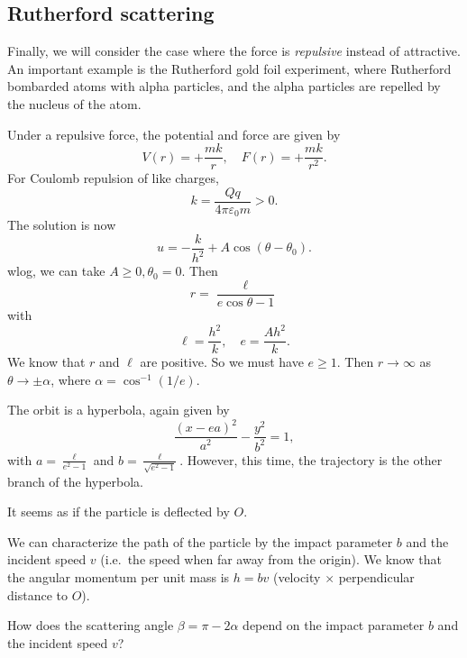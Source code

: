 \documentclass[a4paper]{article}
\begin{document}
\subsection{Rutherford scattering}
Finally, we will consider the case where the force is \emph{repulsive} instead of attractive. An important example is the Rutherford gold foil experiment, where Rutherford bombarded atoms with alpha particles, and the alpha particles are repelled by the nucleus of the atom.

Under a repulsive force, the potential and force are given by
\[
  V(r) = +\frac{mk}{r}, \quad F(r) = +\frac{mk}{r^2}.
\]
For Coulomb repulsion of like charges,
\[
  k = \frac{Qq}{4\pi \varepsilon_0 m} > 0.
\]
The solution is now
\[
  u = -\frac{k}{h^2} + A\cos (\theta - \theta_0).
\]
wlog, we can take $A \geq 0, \theta_0 = 0$. Then
\[
  r = \frac{\ell}{e\cos \theta - 1}
\]
with
\[
  \ell = \frac{h^2}{k}, \quad e = \frac{Ah^2}{k}.
\]
We know that $r$ and $\ell$ are positive. So we must have $e \geq 1$. Then $r\to \infty$ as $\theta \to \pm \alpha$, where $\alpha = \cos^{-1}(1/e)$.

The orbit is a hyperbola, again given by
\[
  \frac{(x - ea)^2}{a^2} - \frac{y^2}{b^2} = 1,
\]
with $a = \frac{\ell}{e^2 - 1}$ and $b = \frac{\ell}{\sqrt{e^2 - 1}}$. However, this time, the trajectory is the other branch of the hyperbola.
\begin{center}
\end{center}
It seems as if the particle is deflected by $O$.

We can characterize the path of the particle by the impact parameter $b$ and the incident speed $v$ (i.e.\ the speed when far away from the origin). We know that the angular momentum per unit mass is $h = bv$ (velocity $\times$ perpendicular distance to $O$).

How does the scattering angle $\beta = \pi - 2\alpha$ depend on the impact parameter $b$ and the incident speed $v$?
\end{document}
